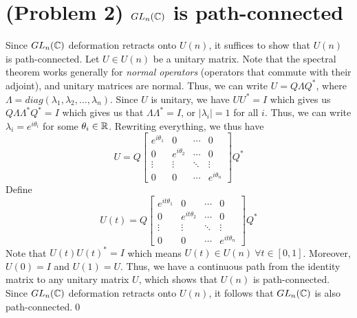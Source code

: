\documentclass[main.tex]{subfiles}
\begin{document}
\section{\textbf{(Problem 2)} $GL_n(\mathbb C)$ is path-connected}
Since $GL_n(\mathbb C)$ deformation retracts onto $U(n)$, it suffices to show that $U(n)$ is path-connected. Let $U \in U(n)$ be a unitary matrix. Note that the spectral theorem works generally for \emph{normal operators} (operators that commute with their adjoint), and unitary matrices are normal. Thus, we can write $U = Q \Lambda Q^*$, where $\Lambda=diag(\lambda_1,\lambda_2,\ldots,\lambda_n)$. Since $U$ is unitary, we have $UU^*=I$ which gives us $Q \Lambda \Lambda^* Q^*=I $ which gives us that $\Lambda \Lambda^*=I$, or $|\lambda_i|=1$ for all $i$. Thus, we can write $\lambda_i = e^{i\theta_i}$ for some $\theta_i \in \mathbb R$. Rewriting everything, we thus have $$U= Q \begin{bmatrix}
e^{i\theta_1} & 0 & \cdots & 0 \\
0 & e^{i\theta_2} & \cdots & 0 \\
\vdots & \vdots & \ddots & \vdots \\
0 & 0 & \cdots & e^{i\theta_n}
\end{bmatrix}Q^* $$ 
Define $$U(t)=Q \begin{bmatrix}
e^{it\theta_1} & 0 & \cdots & 0 \\
0 & e^{it\theta_2} & \cdots & 0 \\
\vdots & \vdots & \ddots & \vdots \\
0 & 0 & \cdots & e^{it\theta_n}\end{bmatrix}Q^*$$
Note that $U(t) U(t)^*=I$ which means $U(t) \in U(n) \ \forall t \in [0,1]$. Moreover, $U(0)=I$ and $U(1)=U$. Thus, we have a continuous path from the identity matrix to any unitary matrix $U$, which shows that $U(n)$ is path-connected. Since $GL_n(\mathbb C)$ deformation retracts onto $U(n)$, it follows that $GL_n(\mathbb C)$ is also path-connected.\newline \qed
\end{document}
